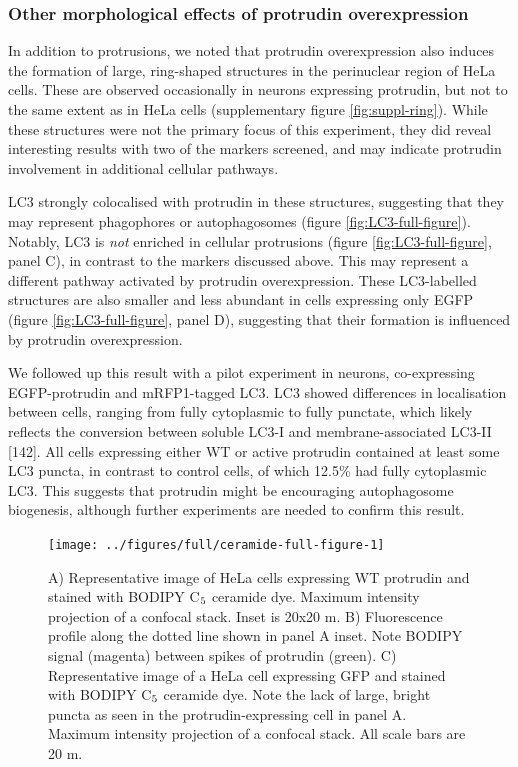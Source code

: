 \documentclass[
  12pt,
  a4paper,
]{book}
\begin{document}
\hypertarget{other-morphological-effects-of-protrudin-overexpression}{%
\subsubsection{Other morphological effects of protrudin overexpression}\label{other-morphological-effects-of-protrudin-overexpression}}

In addition to protrusions, we noted that protrudin overexpression also induces the formation of large, ring-shaped structures in the perinuclear region of HeLa cells. These are observed occasionally in neurons expressing protrudin, but not to the same extent as in HeLa cells (supplementary figure \ref{fig:suppl-ring}). While these structures were not the primary focus of this experiment, they did reveal interesting results with two of the markers screened, and may indicate protrudin involvement in additional cellular pathways.

LC3 strongly colocalised with protrudin in these structures, suggesting that they may represent phagophores or autophagosomes (figure \ref{fig:LC3-full-figure}). Notably, LC3 is \emph{not} enriched in cellular protrusions (figure \ref{fig:LC3-full-figure}, panel C), in contrast to the markers discussed above. This may represent a different pathway activated by protrudin overexpression. These LC3-labelled structures are also smaller and less abundant in cells expressing only EGFP (figure \ref{fig:LC3-full-figure}, panel D), suggesting that their formation is influenced by protrudin overexpression.

We followed up this result with a pilot experiment in neurons, co-expressing EGFP-protrudin and mRFP1-tagged LC3. LC3 showed differences in localisation between cells, ranging from fully cytoplasmic to fully punctate, which likely reflects the conversion between soluble LC3-I and membrane-associated LC3-II {[}142{]}. All cells expressing either WT or active protrudin contained at least some LC3 puncta, in contrast to control cells, of which 12.5\% had fully cytoplasmic LC3. This suggests that protrudin might be encouraging autophagosome biogenesis, although further experiments are needed to confirm this result.

\vspace{14pt}
\begin{figure}[h]
\texttt{[image: ../figures/full/ceramide-full-figure-1]} \caption[Protrudin effect on BODIPY C$\textsubscript{5}$ ceramide localisation in HeLa cells]{A) Representative image of HeLa cells expressing WT protrudin and stained with BODIPY C$\textsubscript{5}$ ceramide dye.  Maximum intensity projection of a confocal stack.  Inset is 20x20 \textmu{}m.  B) Fluorescence profile along the dotted line shown in panel A inset.  Note BODIPY signal (magenta) between spikes of protrudin (green).  C) Representative image of a HeLa cell expressing GFP and stained with BODIPY C$\textsubscript{5}$ ceramide dye.  Note the lack of large, bright puncta as seen in the protrudin-expressing cell in panel A.  Maximum intensity projection of a confocal stack.  All scale bars are 20 \textmu{}m.}\label{fig:ceramide-full-figure}
\end{figure}
\end{document}
